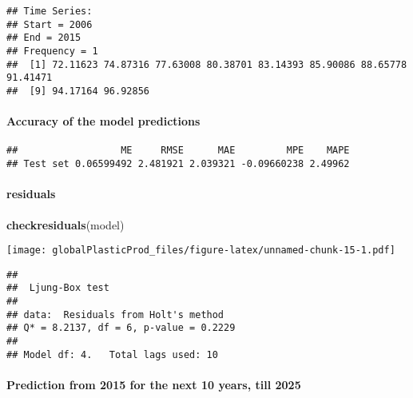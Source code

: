 \documentclass[
]{article}
\newenvironment{Shaded}{\begin{snugshade}}{\end{snugshade}}
\newcommand{\KeywordTok}[1]{\textcolor[rgb]{0.13,0.29,0.53}{\textbf{#1}}}
\newcommand{\NormalTok}[1]{#1}
\newcommand{\OperatorTok}[1]{\textcolor[rgb]{0.81,0.36,0.00}{\textbf{#1}}}
\begin{document}
\begin{verbatim}
## Time Series:
## Start = 2006 
## End = 2015 
## Frequency = 1 
##  [1] 72.11623 74.87316 77.63008 80.38701 83.14393 85.90086 88.65778 91.41471
##  [9] 94.17164 96.92856
\end{verbatim}

\hypertarget{accuracy-of-the-model-predictions}{%
\paragraph{Accuracy of the model
predictions}\label{accuracy-of-the-model-predictions}}

\begin{Shaded}
\end{Shaded}

\begin{verbatim}
##                  ME     RMSE      MAE         MPE    MAPE
## Test set 0.06599492 2.481921 2.039321 -0.09660238 2.49962
\end{verbatim}

\hypertarget{residuals}{%
\paragraph{residuals}\label{residuals}}

\begin{Shaded}
\begin{Highlighting}[]
\KeywordTok{checkresiduals}\NormalTok{(model)}
\end{Highlighting}
\end{Shaded}

\texttt{[image: globalPlasticProd\_files/figure-latex/unnamed-chunk-15-1.pdf]}

\begin{verbatim}
## 
##  Ljung-Box test
## 
## data:  Residuals from Holt's method
## Q* = 8.2137, df = 6, p-value = 0.2229
## 
## Model df: 4.   Total lags used: 10
\end{verbatim}

\hypertarget{prediction-from-2015-for-the-next-10-years-till-2025}{%
\paragraph{Prediction from 2015 for the next 10 years, till
2025}\label{prediction-from-2015-for-the-next-10-years-till-2025}}
\end{document}
